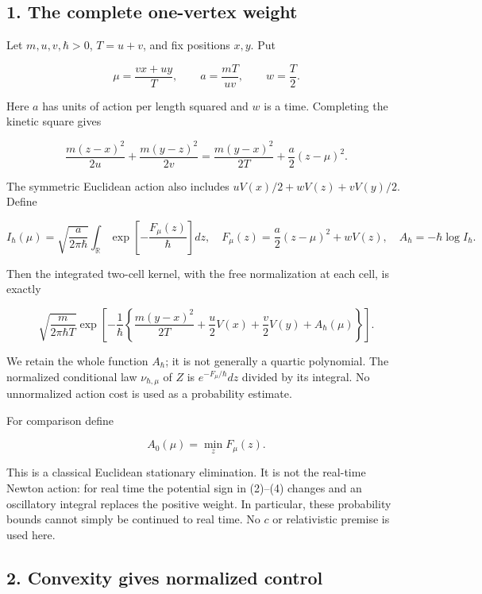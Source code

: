 \documentclass[11pt,a4paper]{article}
\begin{document}
\hypertarget{the-complete-one-vertex-weight}{%
\subsection{1. The complete one-vertex
weight}\label{the-complete-one-vertex-weight}}

Let \(m,u,v,\hbar>0\), \(T=u+v\), and fix positions \(x,y\). Put

\[
 \mu=\frac{vx+uy}{T},\qquad
 a=\frac{mT}{uv},\qquad w=\frac T2.
 \tag{1}
\]

Here \(a\) has units of action per length squared and \(w\) is a time.
Completing the kinetic square gives

\[
 \frac{m(z-x)^2}{2u}+\frac{m(y-z)^2}{2v}
 =\frac{m(y-x)^2}{2T}+\frac a2(z-\mu)^2.
 \tag{2}
\]

The symmetric Euclidean action also includes \(uV(x)/2+wV(z)+vV(y)/2\).
Define

\[
 I_\hbar(\mu)=\sqrt{\frac{a}{2\pi\hbar}}
 \int_{\mathbb R}\exp\left[-\frac{F_\mu(z)}{\hbar}\right]dz,
 \quad F_\mu(z)=\frac a2(z-\mu)^2+wV(z),\quad
 A_\hbar=-\hbar\log I_\hbar.
 \tag{3}
\]

Then the integrated two-cell kernel, with the free normalization at each
cell, is exactly

\[
 \sqrt{\frac{m}{2\pi\hbar T}}
 \exp\left[-\frac1\hbar\left\{
 \frac{m(y-x)^2}{2T}+\frac u2V(x)+\frac v2V(y)
       +A_\hbar(\mu)\right\}\right].
 \tag{4}
\]

We retain the whole function \(A_\hbar\); it is not generally a quartic
polynomial. The normalized conditional law \(\nu_{\hbar,\mu}\) of \(Z\)
is \(e^{-F_\mu/\hbar}dz\) divided by its integral. No unnormalized
action cost is used as a probability estimate.

For comparison define

\[A_0(\mu)=\min_z F_\mu(z).\tag{5}\]

This is a classical Euclidean stationary elimination. It is not the
real-time Newton action: for real time the potential sign in (2)--(4)
changes and an oscillatory integral replaces the positive weight. In
particular, these probability bounds cannot simply be continued to real
time. No \(c\) or relativistic premise is used here.

\hypertarget{convexity-gives-normalized-control}{%
\subsection{2. Convexity gives normalized
control}\label{convexity-gives-normalized-control}}
\end{document}
